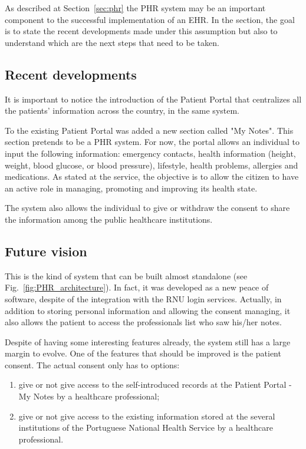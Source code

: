 As described at Section~\ref{sec:phr} the PHR system may be an important component to the successful implementation of an EHR. In the section, the goal is to state the recent developments made under this assumption but also to understand which are the next steps that need to be taken.

\subsection{Recent developments}

It is important to notice the introduction of the Patient Portal that centralizes all the patients' information across the country, in the same system.

To the existing Patient Portal was added a new section called "My Notes". This section pretends to be a PHR system. For now, the portal allows an individual to input the following information: emergency contacts, health information (height, weight, blood glucose, or blood pressure), lifestyle, health problems, allergies and medications. As stated at the service, the objective is to allow the citizen to have an active role in managing, promoting and improving its health state.

The system also allows the individual to give or withdraw the consent to share the information among the public healthcare institutions.

\subsection{Future vision}


This is the kind of system that can be built almost standalone (see Fig.~\ref{fig:PHR_architecture}). In fact, it was developed as a new peace of software, despite of the integration with the RNU login services. Actually, in addition to storing personal information and allowing the consent managing, it also allows the patient to access the professionals list who saw his/her notes.

Despite of having some interesting features already, the system still has a large margin to evolve. One of the features that should be improved is the patient consent. The actual consent only has to options:
\begin{enumerate}
\item give or not give access to the self-introduced records at the Patient Portal - My Notes by a healthcare professional;
\item give or not give access to the existing information stored at the several institutions of the Portuguese National Health Service by a healthcare professional.
\end{enumerate}

